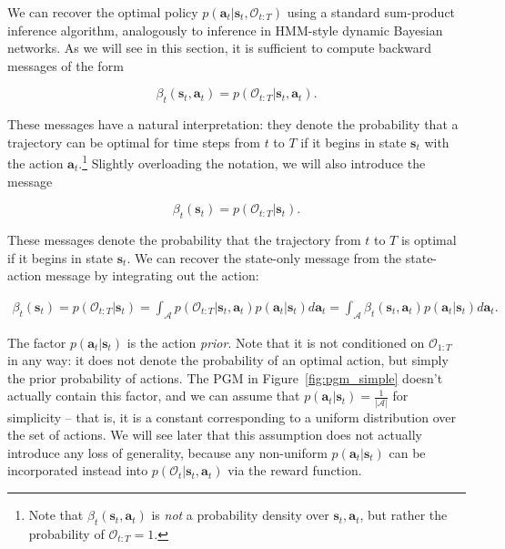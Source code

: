 We can recover the optimal policy $p(\mathbf{a}_t|\mathbf{s}_t,\mathcal{O}_{t:T})$ using a standard sum-product inference algorithm, analogously to inference in HMM-style dynamic Bayesian networks. As we will see in this section, it is sufficient to compute backward messages of the form

\begin{equation}
\beta_t(\mathbf{s}_t,\mathbf{a}_t) = p(\mathcal{O}_{t:T}|\mathbf{s}_t,\mathbf{a}_t). \nonumber
\end{equation}

These messages have a natural interpretation: they denote the probability that a trajectory can be optimal for time steps from $t$ to $T$ if it begins in state $\mathbf{s}_t$ with the action $\mathbf{a}_t$.\footnote{Note that $\beta_t(\mathbf{s}_t,\mathbf{a}_t)$ is \emph{not} a probability density over $\mathbf{s}_t, \mathbf{a}_t$, but rather the probability of $\mathcal{O}_{t:T} = 1$.} Slightly overloading the notation, we will also introduce the message

\begin{equation}
\beta_t(\mathbf{s}_t) = p(\mathcal{O}_{t:T}|\mathbf{s}_t). \nonumber
\end{equation}

These messages denote the probability that the trajectory from $t$ to $T$ is optimal if it begins in state $\mathbf{s}_t$. We can recover the state-only message from the state-action message by integrating out the action:

\begin{align}
\beta_t(\mathbf{s}_t) = p(\mathcal{O}_{t:T}|\mathbf{s}_t) = \int_{\mathcal{A}} p(\mathcal{O}_{t:T}|\mathbf{s}_t,\mathbf{a}_t) p(\mathbf{a}_t|\mathbf{s}_t) d\mathbf{a}_t = \int_{\mathcal{A}} \beta_t(\mathbf{s}_t,\mathbf{a}_t) p(\mathbf{a}_t|\mathbf{s}_t) d\mathbf{a}_t. \nonumber
\end{align}

The factor $p(\mathbf{a}_t|\mathbf{s}_t)$ is the action \emph{prior}. Note that it is not conditioned on $\mathcal{O}_{1:T}$ in any way: it does not denote the probability of an optimal action, but simply the prior probability of actions. The PGM in Figure~\ref{fig:pgm_simple} doesn't actually contain this factor, and we can assume that $p(\mathbf{a}_t|\mathbf{s}_t) = \frac{1}{|\mathcal{A}|}$ for simplicity -- that is, it is a constant corresponding to a uniform distribution over the set of actions. We will see later that this assumption does not actually introduce any loss of generality, because any non-uniform $p(\mathbf{a}_t|\mathbf{s}_t)$ can be incorporated instead into $p(\mathcal{O}_t | \mathbf{s}_t, \mathbf{a}_t)$ via the reward function.

